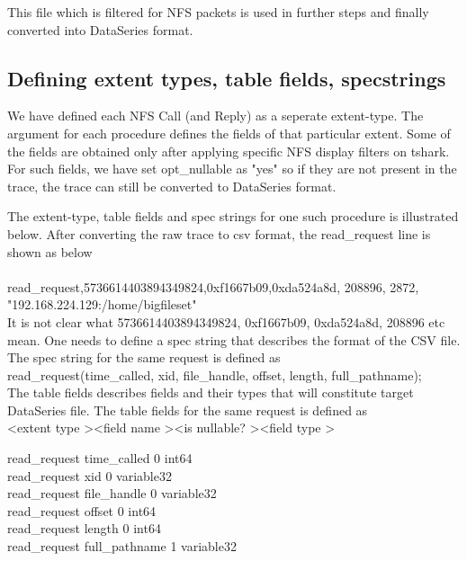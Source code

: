 \documentclass[conference]{IEEEtran}
\begin{document}
\noindent
This file which is filtered for NFS packets is used in further steps and finally converted into DataSeries format.

\subsection{Defining extent types, table fields, specstrings}
We have defined each NFS Call (and Reply) as a seperate extent-type. The argument for each procedure defines the fields of that particular extent. Some of the fields are obtained only after applying specific NFS display filters on tshark. For such fields, we have set opt\_nullable as "yes" so if they are not present in the trace, the trace can still be converted to DataSeries format.

The extent-type, table fields and spec strings for one such procedure is illustrated below. After converting the raw trace to csv format, the read\_request line is shown as below\\ \\
\noindent
read\_request,5736614403894349824,0xf1667b09,0xda524a8d, 208896, 2872, "192.168.224.129:/home/bigfileset"\\

\noindent
It is not clear what 5736614403894349824, 0xf1667b09, 0xda524a8d, 208896 etc mean.  One needs to define a spec
string that describes the format of the CSV file. The spec string for the same request is defined as \\

\noindent
read\_request(time\_called, xid, file\_handle, offset, length, full\_pathname);\\

\noindent
The table fields describes fields and their types that will constitute target DataSeries file. The table fields for the same request is defined as\\

\noindent 
\textless extent type \textgreater \textless field name \textgreater \textless is nullable? \textgreater \textless field type \textgreater

\noindent
read\_request    time\_called	0      int64\\
read\_request	   xid			0	  variable32\\
read\_request    file\_handle		0       variable32\\
read\_request    offset			0       int64\\
read\_request    length			0       int64\\
read\_request    full\_pathname  1	  variable32\\
\end{document}
